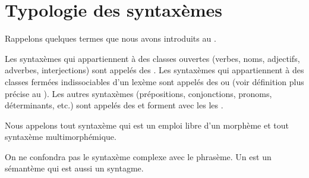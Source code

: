 \section{Typologie des syntaxèmes}\label{sec:3.1.10}

Rappelons quelques termes que nous avons introduits au .

Les syntaxèmes qui appartiennent à des classes ouvertes (verbes, noms, adjectifs, adverbes, interjections) sont appelés des . Les syntaxèmes qui appartiennent à des classes fermées indissociables d’un lexème sont appelés des  ou  (voir définition plus précise au ). Les autres syntaxèmes (prépositions, conjonctions, pronoms, déterminants, etc.) sont appelés des  et forment avec les  les .

Nous appelons  tout syntaxème qui est un emploi libre d’un morphème et  tout syntaxème multimorphémique.

On ne confondra pas le syntaxème complexe avec le phrasème. Un  est un sémantème qui est aussi un syntagme.

